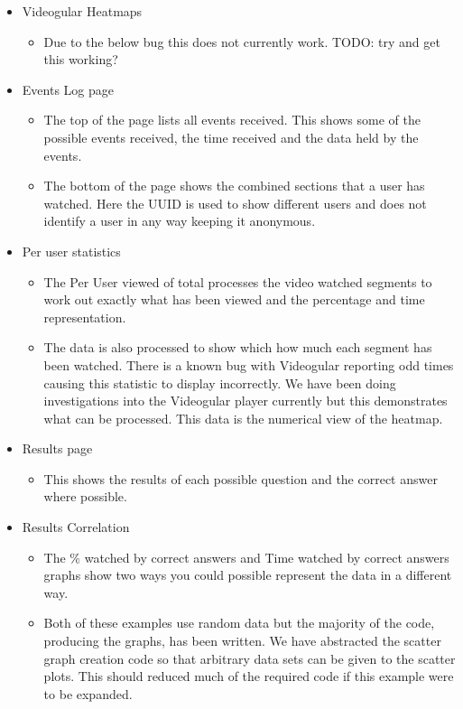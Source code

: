 \documentclass[12pt,a4paper]{article}
\begin{document}
\begin{itemize}
\item Videogular Heatmaps
	\begin{itemize}
	\item Due to the below bug this does not currently work. TODO: try and get this working?
	\end{itemize}

\item Events Log page
	\begin{itemize}
	\item The top of the page lists all events received. This shows some of the possible events received, the time received and the data held by the events.
	\item The bottom of the page shows the combined sections that a user has watched. Here the UUID is used to show different users and does not identify a user in any way keeping it anonymous.
	\end{itemize}
	
\item Per user statistics
	\begin{itemize}
	\item The Per User viewed of total processes the video watched segments to work out exactly what has been viewed and the percentage and time representation.
	\item The data is also processed to show which how much each segment has been watched. There is a known bug with Videogular reporting odd times causing this statistic to display incorrectly. We have been doing investigations into the Videogular player currently but this demonstrates what can be processed. This data is the numerical view of the heatmap.
	\end{itemize}

\item Results page
	\begin{itemize}
	\item This shows the results of each possible question and the correct answer where possible.
	\end{itemize}

\item Results Correlation
	\begin{itemize}
	\item The \% watched by correct answers and Time watched by correct answers graphs show two ways you could possible represent the data in a different way.
	\item Both of these examples use random data but the majority of the code, producing the graphs, has been written. We have abstracted the scatter graph creation code so that arbitrary data sets can be given to the scatter plots. This should reduced much of the required code if this example were to be expanded.
	\end{itemize}

\end{itemize}
\end{document}

